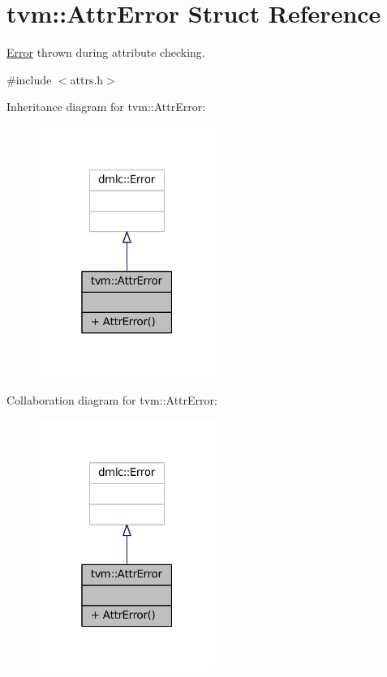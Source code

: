 \hypertarget{structtvm_1_1AttrError}{}\section{tvm\+:\+:Attr\+Error Struct Reference}
\label{structtvm_1_1AttrError}


\hyperlink{classtvm_1_1Error}{Error} thrown during attribute checking.  




{\ttfamily \#include $<$attrs.\+h$>$}



Inheritance diagram for tvm\+:\+:Attr\+Error\+:
\nopagebreak
\begin{figure}[H]
\begin{center}
\leavevmode
\includegraphics[width=163pt]{structtvm_1_1AttrError__inherit__graph}
\end{center}
\end{figure}


Collaboration diagram for tvm\+:\+:Attr\+Error\+:
\nopagebreak
\begin{figure}[H]
\begin{center}
\leavevmode
\includegraphics[width=163pt]{structtvm_1_1AttrError__coll__graph}
\end{center}
\end{figure}
